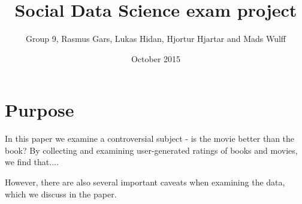 \documentclass[12pt]{article}
\title{Social Data Science exam project}
\author{Group 9, Rasmus Gars, Lukas Hidan, Hjortur Hjartar and Mads Wulff}
\date{October 2015}
\begin{document}
\maketitle

	\section{Purpose} %
	\label{sec:problem_1}
	In this paper we examine a controversial subject - is the movie better than the book? By collecting and examining user-generated ratings of books and movies, we find that....

	However, there are also several important caveats when examining the data, which we discuss in the paper. 

	
\end{document}
